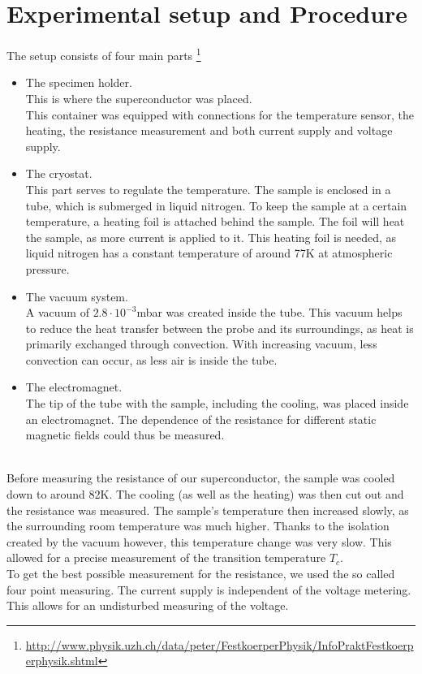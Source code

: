 \documentclass[a4paper,parskip,11pt, DIV12]{scrreprt}
\begin{document}
\chapter{Experimental setup and Procedure}
The setup consists of four main parts \footnote{\url{http://www.physik.uzh.ch/data/peter/FestkoerperPhysik/InfoPraktFestkoerperphysik.shtml}}\\
\begin{itemize}
\item The specimen holder.\\
 This is where the superconductor was placed.\\ This container was equipped with connections for the temperature sensor, the heating, the resistance measurement and both current supply and voltage supply.\\
\item The cryostat.\\
This part serves to regulate the temperature. The sample is enclosed in a tube, which is submerged in liquid nitrogen. To keep the sample at a certain temperature, a heating foil is attached behind the sample. The foil will heat the sample, as more current is applied to it. This heating foil is needed, as liquid nitrogen has a constant temperature of around 77K at atmospheric pressure. \\
\item The vacuum system.\\
A vacuum of $2.8 \cdot 10^{-3}$mbar was created inside the tube. This vacuum helps to reduce the heat transfer between the probe and its surroundings, as heat is primarily exchanged through convection. With increasing vacuum, less convection can occur, as less air is inside the tube. 
\item The electromagnet.\\
The tip of the tube with the sample, including the cooling, was placed inside an electromagnet. The dependence of the resistance for different static magnetic fields could thus be measured.
\end{itemize}

~\\
  
Before measuring the resistance of our superconductor, the sample was cooled down to around 82K. The cooling (as well as the heating) was then cut out and the resistance was measured. The sample's temperature then increased slowly, as the surrounding room temperature was much higher. Thanks to the isolation created by the vacuum however, this temperature change was very slow. This allowed for a precise measurement of the transition temperature $T_c$.\\
To get the best possible measurement for the resistance, we used the so called four point measuring. The current supply is independent of the voltage metering. This allows for an undisturbed measuring of the voltage. 
\end{document}

